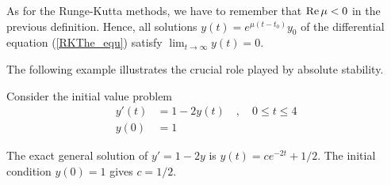 \begin{rmk}
As for the Runge-Kutta methods, we have to remember that $\operatorname{Re} \mu < 0$
in the previous definition.  Hence, all solutions
$y(t) = e^{\mu(t-t_0)}y_0$ of the differential equation (\ref{RKThe_equ}) satisfy
$\displaystyle \lim_{t\to \infty} y(t) = 0$.
\end{rmk}

The following example illustrates the crucial role played by
absolute stability.

\begin{egg}
Consider the initial value problem
\begin{equation} \label{stable_ex1}
\begin{split}
y'(t) &= 1 -2y(t) \quad , \quad 0\leq t \leq 4 \\
y(0) &= 1
\end{split}
\end{equation}

The exact general solution of $y'= 1-2y$ is $y(t) = c e^{-2t} +1/2$.
The initial condition $y(0)=1$ gives $c = 1/2$.


\end{egg}
